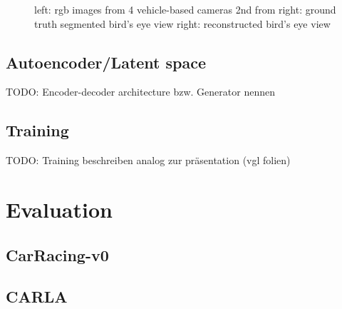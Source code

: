 \documentclass[letterpaper, 10 pt, conference]{ieeeconf}  %
\begin{document}
\begin{figure}[thpb]
   \centering
   \caption{left: rgb images from 4 vehicle-based cameras
            2nd from right: ground truth segmented bird's eye view
            right: reconstructed bird's eye view}
       \label{figurelabel}
       \end{figure}

\subsection{Autoencoder/Latent space}
TODO: Encoder-decoder architecture bzw. Generator nennen
\subsection{Training}
TODO: Training beschreiben analog zur präsentation (vgl folien)


\section{Evaluation}

\subsection{CarRacing-v0}
\subsection{CARLA}
\end{document}
